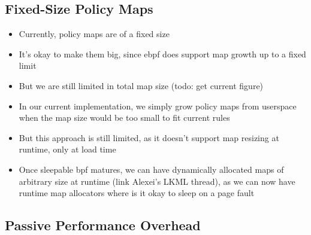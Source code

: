 \subsection{Fixed-Size Policy Maps}

\begin{inprogress}
  \begin{itemize}
    \item Currently, policy maps are of a fixed size
    \item It's okay to make them big, since \gls{ebpf} does support map growth up to a fixed limit
    \item But we are still limited in total map size (todo: get current figure)
    \item In our current implementation, we simply grow policy maps from userspace when the map size would be too small to fit current rules
    \item But this approach is still limited, as it doesn't support map resizing at runtime, only at load time
    \item Once sleepable \gls{bpf} matures, we can have dynamically allocated maps of
    arbitrary size at runtime (link Alexei's LKML thread), as we can now have runtime map
    allocators where is it okay to sleep on a page fault
  \end{itemize}
\end{inprogress}

\subsection{Passive Performance Overhead}

